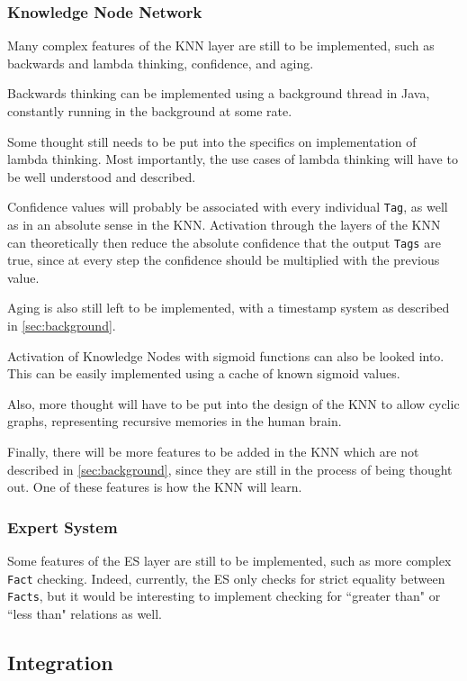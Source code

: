\documentclass[titlepage,11pt]{article}
\newcommand{\code}[1]{\texttt{#1}}
\begin{document}
\subsubsection{Knowledge Node Network}

Many complex features of the KNN layer are still to be implemented, such as backwards and lambda thinking, confidence, and aging.

Backwards thinking can be implemented using a background thread in Java, constantly running in the background at some rate.

Some thought still needs to be put into the specifics on implementation of lambda thinking. Most importantly, the use cases of lambda thinking will have to be well understood and described.

Confidence values will probably be associated with every individual \code{Tag}, as well as in an absolute sense in the KNN. Activation through the layers of the KNN can theoretically then reduce the absolute confidence that the output \code{Tags} are true, since at every step the confidence should be multiplied with the previous value.

Aging is also still left to be implemented, with a timestamp system as described in \autoref{sec:background}.

Activation of Knowledge Nodes with sigmoid functions can also be looked into. This can be easily implemented using a cache of known sigmoid values.

Also, more thought will have to be put into the design of the KNN to allow cyclic graphs, representing recursive memories in the human brain.

Finally, there will be more features to be added in the KNN which are not described in \autoref{sec:background}, since they are still in the process of being thought out. One of these features is how the KNN will learn.

\subsubsection{Expert System}

Some features of the ES layer are still to be implemented, such as more complex \code{Fact} checking. Indeed, currently, the ES only checks for strict equality between \code{Facts}, but it would be interesting to implement checking for ``greater than" or ``less than" relations as well.

\subsection{Integration}
\end{document}
